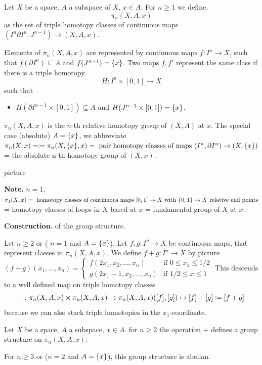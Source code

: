 \documentclass{TemplateLecture}
\begin{document}
\begin{defi}{}{}
    Let \(X\) be a space, \(A\) a subspace of \(X\), \(x \in A\). For \(n \geq 1\) we define.
    \[\pi_n(X,A,x)\]
    as the set of triple homotopy classes of continuous maps \((I^n \partial I^n, J^{n-1}) \to (X,A,x)\).

    Elements of \(\pi_n(X,A,x)\) are represented by continuous maps \(f\colon I^n \to X\), such that \(f(\partial I^n) \subseteq A\) and \(f(J^{n-1}) = \{x\}\). Two maps \(f, f'\) represent the same class if there is a triple homotopy
    \[H\colon I^n \times [0,1] \to X\] such that
    \begin{itemize}
        \item \(H(\partial I^{n-1} \times [0,1]) \subseteq A\) and \(H(J^{n-1}\times [0,1]) = \{x\}\).
    \end{itemize}
    \(\pi_n(X,A,x)\) is the \(n\)-th relative homotopy group of \((X,A)\) at \(x\).
    The special case (absolute) \(A = \{x\}\), we abbreviate \(\pi_n(X,x) = \coloneq \pi_n(X, \{x\}, x) = \text{ pair homotopy classes of maps } (I^n , \partial I^n) \to (X, \{x\})\) = the absolute n-th homotopy group of \((X,x)\).
\end{defi}picture

\textbf{Note.} \(n = 1\). \(\pi_1(X,x) = \text{ homotopy classes of continuous maps } [0,1] \to X \text{ with } \{0,1\} \to X \text{ relative end points}\) = homotopy classes of loops in \(X\) based at \(x\) = fundamental group of \(X\) at \(x\).

\textbf{Construction.} of the group structure.

Let \(n \geq 2\) or ( \(n = 1\) and \(A = \{x\}\)). Let \(f,g \colon I^n \to X\) be continouus maps, that represent classes in \(\pi_n(X,A,x)\). We define \(f+g \colon I^n \to X\) by
picture
\((f+g)(x_1, \dots, x_n) = \begin{cases}
    f(2x_1, x_2, \dots, x_n) & \text{if } 0 \leq x_1 \leq 1/2 \\
    g(2x_1 -1, x_2, \dots, x_n) & \text{if } 1/2 \leq x \leq 1
\end{cases}\)
This descends to a well defined map on triple homotopy classes
\[+ \colon \pi_n(X,A,x) \times \pi_n(X,A,x) \to \pi_n(X,A,x) \\ ([f], [g]) \mapsto [f] + [g] \coloneq [f+g]\]
because we can also stack triple homotopies in the \(x_1\)-coordinate.

\begin{thm}{}{}
    Let \(X\) be a space, \(A\) a subspace, \(x \in A\). for \(n \geq 2\) the operation \(+\) defines a group structure on \(\pi_n(X,A, x)\).

    For \(n \geq 3\) or (\(n = 2\) and \(A = \{x\}\)), this group structure is abelian.
\end{thm}
\end{document}
